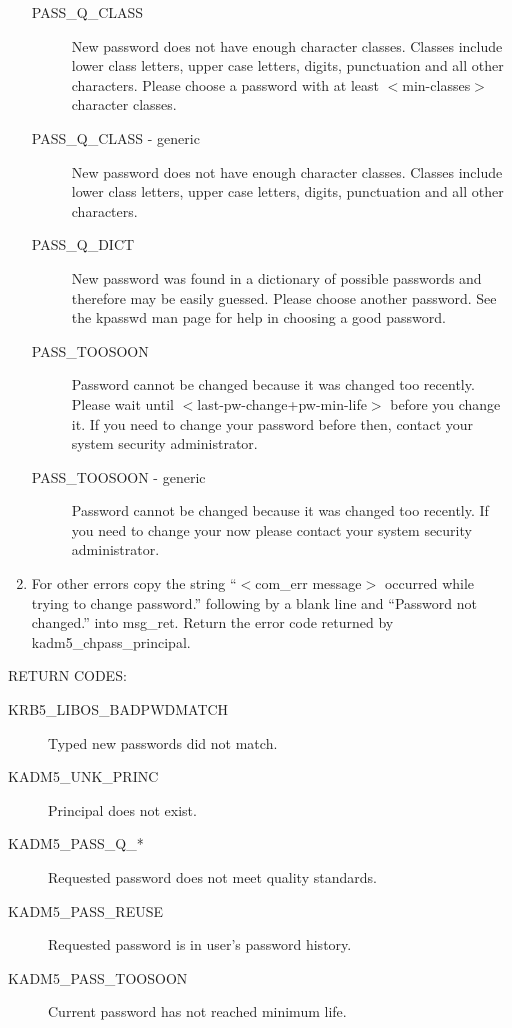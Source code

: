 \begin{enumerate}
\begin{description}
\item[PASS_Q_CLASS]
New password does not have enough character classes. Classes include
lower class letters, upper case letters, digits, punctuation and all
other characters.  Please choose a password with at least
$<$min-classes$>$ character classes.

\item[PASS_Q_CLASS - generic]
New password does not have enough character classes. Classes include
lower class letters, upper case letters, digits, punctuation and all
other characters. 

\item[PASS_Q_DICT] 
New password was found in a dictionary of possible passwords and
therefore may be easily guessed.  Please choose another password. See
the kpasswd man page for help in choosing a good password.

\item[PASS_TOOSOON]
Password cannot be changed because it was changed too recently. Please
wait until $<$last-pw-change+pw-min-life$>$ before you change it. If you
need to change your password before then, contact your system
security administrator.

\item[PASS_TOOSOON - generic]
Password cannot be changed because it was changed too recently. If you
need to change your now please contact your system security
administrator.
\end{description}

\item For other errors copy the string ``$<$com_err message$>$
occurred while trying to change password.'' following by a blank line
and ``Password not changed.'' into msg_ret. Return the error code
returned by kadm5_chpass_principal.
\end{enumerate}


RETURN CODES:

\begin{description}
\item[KRB5_LIBOS_BADPWDMATCH] Typed new passwords did not match.
\item[KADM5_UNK_PRINC] Principal does not exist.
\item[KADM5_PASS_Q_*] Requested password does not meet quality
standards. 
\item[KADM5_PASS_REUSE] Requested password is in user's
password history. 
\item[KADM5_PASS_TOOSOON] Current password has not reached minimum
life. 
\end{description}


